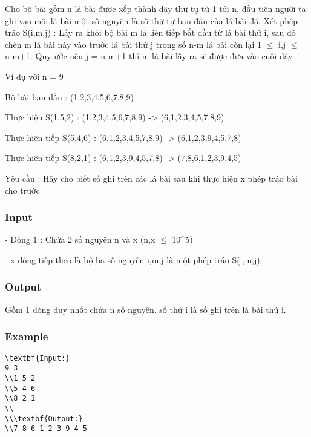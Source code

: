 



   Cho bộ bài gồm n lá bài được xếp thành dãy thứ tự từ 1 tới n, đầu tiên người ta ghi vao mỗi lá bài một số nguyên là số thứ tự ban đầu của lá bài đó. Xét phép tráo S(i,m,j) : Lấy ra khỏi bộ bài m lá liên tiếp bắt đầu từ lá bài thứ i, sau đó chèn m lá bài này vào trước lá bài thứ j trong số n-m lá bài còn lại 1 $\le$ i,j $\le$ n-m+1. Quy ước nếu j = n-m+1 thì m lá bài lấy ra sẽ được đưa vào cuối dãy  

   Ví dụ với n = 9  

   Bộ bài ban đầu : (1,2,3,4,5,6,7,8,9)  

   Thực hiện S(1,5,2) : (1,2,3,4,5,6,7,8,9) -> (6,1,2,3,4,5,7,8,9)  

   Thực hiện tiếp S(5,4,6) : (6,1,2,3,4,5,7,8,9) -> (6,1,2,3,9,4,5,7,8)  

   Thực hiện tiếp S(8,2,1) : (6,1,2,3,9,4,5,7,8) -> (7,8,6,1,2,3,9,4,5)  

   Yêu cầu : Hãy cho biết số ghi trên các lá bài sau khi thực hiện x phép tráo bài cho trước  

\subsubsection{   Input  }

   - Dòng 1 : Chứa 2 số nguyên n và x (n,x  $\le$  10^5)  

   - x dòng tiếp theo là bộ ba số nguyên i,m,j là một phép tráo S(i,m,j)  

\subsubsection{   Output  }

   Gồm 1 dòng duy nhất chứa n số nguyên. số thứ i là số ghi trên lá bài thứ i.  

\subsubsection{   Example  }
\begin{verbatim}
\textbf{Input:}
9 3
\\1 5 2
\\5 4 6
\\8 2 1
\\
\\\textbf{Output:}
\\7 8 6 1 2 3 9 4 5 \end{verbatim}
